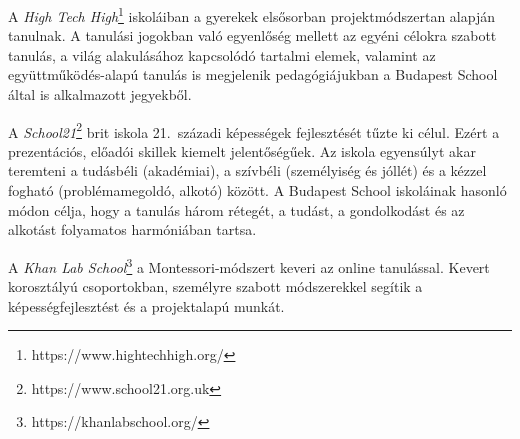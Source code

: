 A \emph{High Tech High}\footnote{https://www.hightechhigh.org/} iskoláiban a gyerekek elsősorban projektmódszertan alapján tanulnak. A tanulási jogokban való egyenlőség mellett az egyéni célokra szabott tanulás, a világ alakulásához kapcsolódó tartalmi elemek, valamint az együttműködés-alapú tanulás is megjelenik pedagógiájukban a Budapest School által is alkalmazott jegyekből.

A \emph{School21}\footnote{https://www.school21.org.uk} brit iskola 21.~századi képességek fejlesztését tűzte ki célul. Ezért a prezentációs, előadói skillek kiemelt jelentőségűek. Az iskola egyensúlyt akar teremteni a tudásbéli (akadémiai), a szívbéli (személyiség és jóllét) és a kézzel fogható (problémamegoldó, alkotó) között. A Budapest School iskoláinak hasonló módon célja, hogy a tanulás három rétegét, a tudást, a gondolkodást és az alkotást folyamatos harmóniában tartsa.

A \emph{Khan Lab School}\footnote{https://khanlabschool.org/} a Montessori-módszert keveri az online tanulással. Kevert korosztályú csoportokban, személyre szabott módszerekkel segítik a képességfejlesztést és a projektalapú munkát. 
